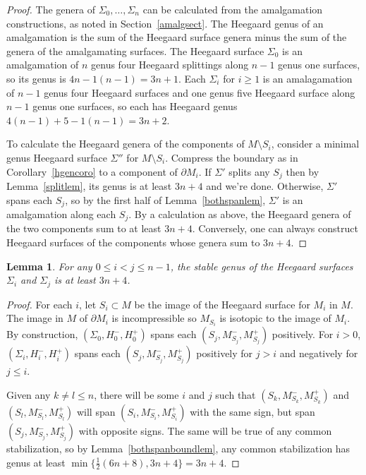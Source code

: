 \documentclass[12pt]{amsart}
\theoremstyle{plain}
\newtheorem{Lem}[Thm]{Lemma}
\theoremstyle{definition}
\begin{document}
\begin{proof}
The genera of $\Sigma_0,\dots,\Sigma_n$ can be calculated from the amalgamation constructions, as noted in Section~\ref{amalgsect}.  The Heegaard genus of an amalgamation is the sum of the Heegaard surface genera minus the sum of the genera of the amalgamating surfaces.  The Heegaard surface $\Sigma_0$ is an amalgamation of $n$ genus four Heegaard splittings along $n-1$ genus one surfaces, so its genus is $4n - 1(n-1) = 3n+1$.  Each $\Sigma_i$ for $i \geq 1$ is an amalagamation of $n-1$ genus four Heegaard surfaces and one genus five Heegaard surface along $n-1$ genus one surfaces, so each has Heegaard genus $4(n-1) + 5 - 1(n-1) = 3n+2$.

To calculate the Heegaard genera of the components of $M \setminus S_i$, consider a minimal genus Heegaard surface $\Sigma''$ for $M \setminus S_i$.  Compress the boundary as in Corollary~\ref{hgencoro} to a component of $\partial M_i$.  If $\Sigma'$ splits any $S_j$ then by Lemma~\ref{splitlem}, its genus is at least $3n+4$ and we're done.  Otherwise, $\Sigma'$ spans each $S_j$, so by the first half of Lemma~\ref{bothspanlem}, $\Sigma'$ is an amalgamation along each $S_j$.  By a calculation as above, the Heegaard genera of the two components sum to at least $3n+4$.  Conversely, one can always construct Heegaard surfaces of the components whose genera sum to $3n+4$.
\end{proof}

\begin{Lem}
For any $0 \leq i < j \leq n-1$, the stable genus of the Heegaard surfaces $\Sigma_i$ and $\Sigma_j$ is at least $3n+4$.
\end{Lem}

\begin{proof}
For each $i$, let $S_i \subset M$ be the image of the Heegaard surface for $M_i$ in $M$.  The image in $M$ of $\partial M_i$ is incompressible so $M_{S_i}$ is isotopic to the image of $M_i$.  By construction, $(\Sigma_0, H^-_0, H^+_0)$ spans each $(S_j, M_{S_j}^-, M_{S_j}^+)$ positively.  For $i > 0$, $(\Sigma_i, H^-_i, H^+_i)$ spans each $(S_j, M_{S_j}^-, M_{S_j}^+)$ positively for $j > i$ and negatively for $j \leq i$.  

Given any $k \neq l \leq n$, there will be some $i$ and $j$ such that $(S_k, M_{S_k}^-, M_{S_k}^+)$ and $(S_l, M_{S_l}^-, M_{S_l}^+)$ will span $(S_i, M_{S_i}^-, M_{S_i}^+)$ with the same sign, but span $(S_j, M_{S_j}^-, M_{S_j}^+)$ with opposite signs.  The same will be true of any common stabilization, so by Lemma~\ref{bothspanboundlem}, any common stabilization has genus at least $\min \{\frac{1}{2}(6n+8), 3n+4\} = 3n+4$.
\end{proof}
\end{document}
